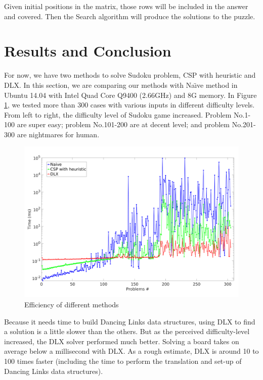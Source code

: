		Given initial positions in the matrix, those rows will be included in the answer and covered. Then the Search algorithm will produce the solutions to the puzzle.



\section{Results and Conclusion}

	For now, we have two methods to solve Sudoku problem, CSP with heuristic and DLX. 
	In this section, we are comparing our methods with Na\"\i{}ve method in Ubuntu 14.04 with Intel Quad Core Q9400 (2.66GHz) and 8G memory.
	In Figure \ref{fig:time}, we tested more than 300 cases with various inputs in different difficulty levels. From left to right, the difficulty level of Sudoku game increased. Problem No.1-100 are super easy; problem No.101-200 are at decent level; and problem No.201-300 are nightmares for human.

	\begin{figure}[ht]
	\centering
	\includegraphics[width=\textwidth]{figure/time.png}
	\caption{Efficiency of different methods}
	\label{fig:time}
	\end{figure}

	Because it needs time to build Dancing Links data structures, using DLX to find a solution is a little slower than the others. 
	But as the perceived difficulty-level increased, the DLX solver performed much better. 
	Solving a board takes on average below a millisecond with DLX. As a rough estimate, DLX is around 10 to 100 times faster (including the time to perform the translation and set-up of Dancing Links data structures).


